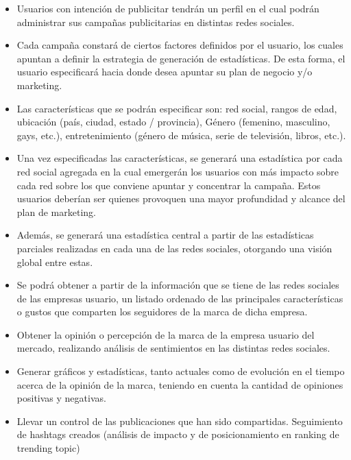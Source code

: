 \documentclass[oneside]{book}
\begin{document}
\begin{itemize}

\item Usuarios con intenci\'{o}n de publicitar tendr\'{a}n un perfil en el cual podr\'{a}n administrar sus campañas publicitarias en distintas redes sociales.

\item Cada campa\~{n}a constar\'{a} de ciertos factores definidos por el usuario, los cuales apuntan a definir la estrategia de generaci\'{o}n de estad\'{i}sticas. De esta forma, el usuario especificar\'{a} hacia donde desea apuntar su plan de negocio y/o marketing.

\item Las caracter\'{i}sticas que se podrán especificar son: red social, rangos de edad, ubicación (pa\'{i}s, ciudad, estado / provincia), Género (femenino, masculino, gays, etc.), entretenimiento (g\'{e}nero de música, serie de televisi\'{o}n, libros, etc.).

\item Una vez especificadas las caracter\'{i}sticas, se generar\'{a} una estad\'{i}stica por cada red social agregada en la cual emerger\'{a}n los usuarios con m\'{a}s impacto sobre cada red sobre los que conviene apuntar y concentrar la campa\~{n}a. Estos usuarios deber\'{i}an ser quienes provoquen una mayor profundidad y alcance del plan de marketing. 

\item Adem\'{a}s, se generará una estad\'{i}stica central a partir de las estad\'{i}sticas parciales realizadas en cada una de las redes sociales, otorgando una visi\'{o}n global entre estas.

\item Se podr\'{a} obtener a partir de la informaci\'{o}n que se tiene de las redes sociales de las empresas usuario, un listado ordenado de las principales caracter\'{i}sticas o gustos que comparten los seguidores de la marca de dicha empresa.

\item Obtener la opinión o percepción de la marca de la empresa usuario del mercado, realizando an\'{a}lisis de sentimientos en las distintas redes sociales.

\item Generar gráficos y estad\'{i}sticas, tanto actuales como de evoluci\'{o}n en el tiempo acerca de la opini\'{o}n de la marca, teniendo en cuenta la cantidad de opiniones positivas y negativas.

\item Llevar un control de las publicaciones que han sido compartidas.
Seguimiento de hashtags creados (an\'{a}lisis de impacto y de posicionamiento en ranking de trending topic)


\end{itemize}
\end{document}
